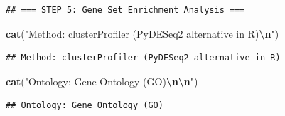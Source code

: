 \documentclass[
]{article}
\newenvironment{Shaded}{\begin{snugshade}}{\end{snugshade}}
\newcommand{\FunctionTok}[1]{\textcolor[rgb]{0.13,0.29,0.53}{\textbf{#1}}}
\newcommand{\NormalTok}[1]{#1}
\newcommand{\SpecialCharTok}[1]{\textcolor[rgb]{0.81,0.36,0.00}{\textbf{#1}}}
\newcommand{\StringTok}[1]{\textcolor[rgb]{0.31,0.60,0.02}{#1}}
\begin{document}
\begin{verbatim}
## === STEP 5: Gene Set Enrichment Analysis ===
\end{verbatim}

\begin{Shaded}
\begin{Highlighting}[]
\FunctionTok{cat}\NormalTok{(}\StringTok{"Method: clusterProfiler (PyDESeq2 alternative in R)}\SpecialCharTok{\textbackslash{}n}\StringTok{"}\NormalTok{)}
\end{Highlighting}
\end{Shaded}

\begin{verbatim}
## Method: clusterProfiler (PyDESeq2 alternative in R)
\end{verbatim}

\begin{Shaded}
\begin{Highlighting}[]
\FunctionTok{cat}\NormalTok{(}\StringTok{"Ontology: Gene Ontology (GO)}\SpecialCharTok{\textbackslash{}n\textbackslash{}n}\StringTok{"}\NormalTok{)}
\end{Highlighting}
\end{Shaded}

\begin{verbatim}
## Ontology: Gene Ontology (GO)
\end{verbatim}
\end{document}
